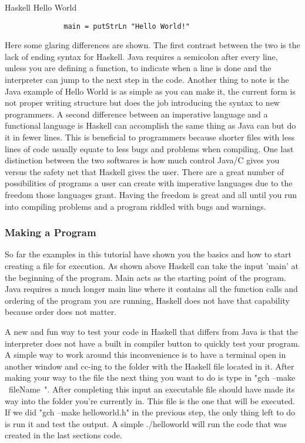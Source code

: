 \documentclass{article}
\begin{document}
    \medskip
    \caption{Haskell Hello World}
    \begin{lstlisting}
              main = putStrLn "Hello World!"
    \end{lstlisting}
    
    \medskip
    Here some glaring differences are shown. The first contrast between the two is the lack of ending syntax for Haskell. Java requires a semicolon after every line, unless you are defining a function, to indicate when a line is done and the interpreter can jump to the next step in the code. Another thing to note is the Java example of Hello World is as simple as you can make it, the current form is not proper writing structure but does the job introducing the syntax to new programmers. A second difference between an imperative language and a functional language is Haskell can accomplish the same thing as Java can but do it in fewer lines. This is beneficial to programmers because shorter files with less lines of code usually equate to less bugs and problems when compiling. One last distinction between the two softwares is how much control Java/C gives you versus the safety net that Haskell gives the user. There are a great number of possibilities of programs a user can create with imperative languages due to the freedom those languages grant. Having the freedom is great and all until you run into compiling problems and a program riddled with bugs and warnings. 
    
    \subsubsection{Making a Program}
    So far the examples in this tutorial have shown you the basics and how to start creating a file for execution. As shown above Haskell can take the input 'main' at the beginning of the program. Main acts as the starting point of the program. Java requires a much longer main line where it contains all the function calls and ordering of the program you are running, Haskell does not have that capability because order does not matter. 
    
    \medskip A new and fun way to test your code in Haskell that differs from Java is that the interpreter does not have a built in compiler button to quickly test your program. A simple way to work around this inconvenience is to have a terminal open in another window and cc-ing to the folder with the Haskell file located in it. After making your way to the file the next thing you want to do is type in "gch --make ~fileName~". After completing this input an executable file should have made its way into the folder you're currently in. This file is the one that will be executed. If we did "gch --make helloworld.h" in the previous step, the only thing left to do is run it and test the output. A simple ./helloworld will run the code that was created in the last sections code. 
    
\end{document}
